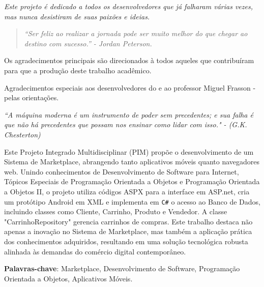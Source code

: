 \documentclass[
	12pt,				%
	openright,			%
	twoside,			%
	a4paper,			%
	english,			%
	brazil				%
	]{abntex2}
\begin{document}
\begin{dedicatoria}
	\vspace*{\fill}
	\centering
	\noindent
	\textit{Este projeto é dedicado a todos os desenvolvedores que já falharam várias vezes, mas nunca desistiram de suas paixões e ideias.}

	\begin{quote}
	\textit{``Ser feliz ao realizar a jornada pode ser muito melhor do que chegar ao destino com sucesso.'' - Jordan Peterson.}
	\end{quote}

	\vspace*{\fill}

\end{dedicatoria}

\begin{agradecimentos}
	Os agradecimentos principais são direcionados à todos aqueles que contribuíram para que a produção deste trabalho acadêmico.

	Agradecimentos especiais aos desenvolvedores do \abnTeX e ao professor Miguel Frasson - pelas orientações.

\end{agradecimentos}


\begin{epigrafe}
	\vspace*{\fill}
	\begin{flushright}
		\textit{``A máquina moderna é um instrumento de poder sem precedentes; e sua falha é que não há precedentes que possam nos ensinar como lidar com isso." - (G.K. Chesterton)}
	\end{flushright}
\end{epigrafe}


\setlength{\absparsep}{18pt} %
\begin{resumo}
    Este Projeto Integrado Multidisciplinar (PIM) propõe o desenvolvimento de um Sistema de Marketplace, abrangendo tanto aplicativos móveis quanto navegadores web. Unindo conhecimentos de Desenvolvimento de Software para Internet, Tópicos Especiais de Programação Orientada a Objetos e Programação Orientada a Objetos II, o projeto utiliza códigos ASPX para a interface em ASP.net, cria um protótipo Android em XML e implementa em \texttt{C\#} o acesso ao Banco de Dados, incluindo classes como Cliente, Carrinho, Produto e Vendedor. A classe "CarrinhoRepository" gerencia carrinhos de compras. Este trabalho destaca não apenas a inovação no Sistema de Marketplace, mas também a aplicação prática dos conhecimentos adquiridos, resultando em uma solução tecnológica robusta alinhada às demandas do comércio digital contemporâneo.

 \textbf{Palavras-chave}: Marketplace, Desenvolvimento de Software, Programação Orientada a Objetos, Aplicativos Móveis.
\end{resumo}
\end{document}

